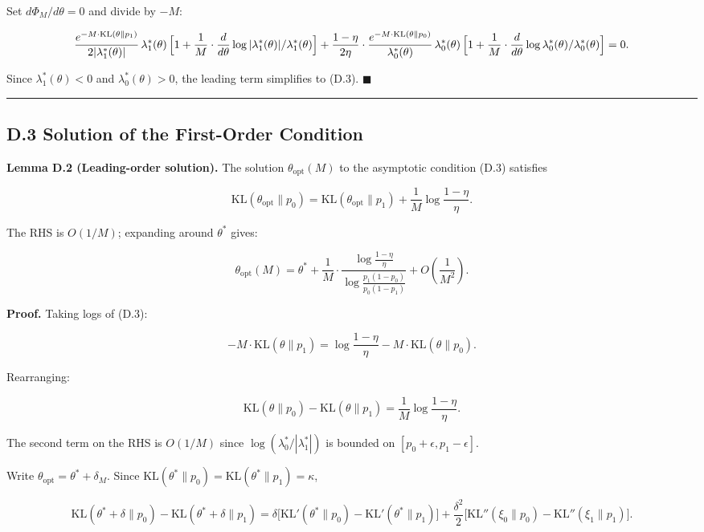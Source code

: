\documentclass[
  12pt,
]{article}
\begin{document}
Set \(d\Phi_M/d\theta = 0\) and divide by \(-M\):

\[
\frac{e^{-M\cdot\text{KL}(\theta\|p_1)}}{2|\lambda_1^*(\theta)|}\,
\lambda_1^*(\theta)\,
\Bigl[1 + \frac{1}{M}\cdot\frac{d}{d\theta}\log|\lambda_1^*(\theta)|/\lambda_1^*(\theta)\Bigr]
+ \frac{1-\eta}{2\eta}\cdot\frac{e^{-M\cdot\text{KL}(\theta\|p_0)}}{\lambda_0^*(\theta)}\,
\lambda_0^*(\theta)\,
\Bigl[1 + \frac{1}{M}\cdot\frac{d}{d\theta}\log\lambda_0^*(\theta)/\lambda_0^*(\theta)\Bigr]
= 0.
\]

Since \(\lambda_1^*(\theta) < 0\) and \(\lambda_0^*(\theta) > 0\), the
leading term simplifies to (D.3). \(\blacksquare\)

\begin{center}\rule{0.5\linewidth}{0.5pt}\end{center}

\subsection{D.3 Solution of the First-Order
Condition}\label{d.3-solution-of-the-first-order-condition}

\textbf{Lemma D.2 (Leading-order solution).} The solution
\(\theta_{\text{opt}}(M)\) to the asymptotic condition (D.3) satisfies

\[
\text{KL}(\theta_{\text{opt}}\|p_0) = \text{KL}(\theta_{\text{opt}}\|p_1)
+ \frac{1}{M}\log\frac{1-\eta}{\eta}. \tag{D.4}
\]

The RHS is \(O(1/M)\); expanding around \(\theta^*\) gives:

\[
\theta_{\text{opt}}(M) = \theta^* + \frac{1}{M}\cdot\frac{\log\frac{1-\eta}{\eta}}{\log\frac{p_1(1-p_0)}{p_0(1-p_1)}} + O\!\left(\frac{1}{M^2}\right). \tag{D.5}
\]

\textbf{Proof.} Taking logs of (D.3):

\[
-M\cdot\text{KL}(\theta\|p_1) = \log\frac{1-\eta}{\eta} - M\cdot\text{KL}(\theta\|p_0).
\]

Rearranging:

\[
\text{KL}(\theta\|p_0) - \text{KL}(\theta\|p_1) = \frac{1}{M}\log\frac{1-\eta}{\eta}. \tag{D.6}
\]

The second term on the RHS is \(O(1/M)\) since
\(\log(\lambda_0^*/|\lambda_1^*|)\) is bounded on
\([p_0+\epsilon, p_1-\epsilon]\).

Write \(\theta_{\text{opt}} = \theta^* + \delta_M\). Since
\(\text{KL}(\theta^*\|p_0) = \text{KL}(\theta^*\|p_1) = \kappa\),

\[
\text{KL}(\theta^*+\delta\|p_0) - \text{KL}(\theta^*+\delta\|p_1)
= \delta\bigl[\text{KL}'(\theta^*\|p_0) - \text{KL}'(\theta^*\|p_1)\bigr] + \frac{\delta^2}{2}\bigl[\text{KL}''(\xi_0\|p_0) - \text{KL}''(\xi_1\|p_1)\bigr].
\]
\end{document}
